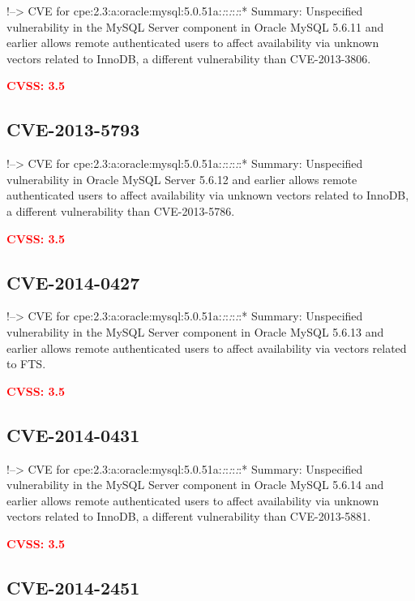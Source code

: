 \documentclass[a4paper, 12pt]{article}
\begin{document}
!--\textgreater{} CVE for
cpe:2.3:a:oracle:mysql:5.0.51a:\emph{:}:\emph{:}:\emph{:}:* Summary:
Unspecified vulnerability in the MySQL Server component in Oracle MySQL
5.6.11 and earlier allows remote authenticated users to affect
availability via unknown vectors related to InnoDB, a different
vulnerability than CVE-2013-3806.

\textbf{\textcolor{red}{CVSS: 3.5}}

\hypertarget{cve-2013-5793}{%
\subsection{CVE-2013-5793}\label{cve-2013-5793}}

!--\textgreater{} CVE for
cpe:2.3:a:oracle:mysql:5.0.51a:\emph{:}:\emph{:}:\emph{:}:* Summary:
Unspecified vulnerability in Oracle MySQL Server 5.6.12 and earlier
allows remote authenticated users to affect availability via unknown
vectors related to InnoDB, a different vulnerability than CVE-2013-5786.

\textbf{\textcolor{red}{CVSS: 3.5}}

\hypertarget{cve-2014-0427}{%
\subsection{CVE-2014-0427}\label{cve-2014-0427}}

!--\textgreater{} CVE for
cpe:2.3:a:oracle:mysql:5.0.51a:\emph{:}:\emph{:}:\emph{:}:* Summary:
Unspecified vulnerability in the MySQL Server component in Oracle MySQL
5.6.13 and earlier allows remote authenticated users to affect
availability via vectors related to FTS.

\textbf{\textcolor{red}{CVSS: 3.5}}

\hypertarget{cve-2014-0431}{%
\subsection{CVE-2014-0431}\label{cve-2014-0431}}

!--\textgreater{} CVE for
cpe:2.3:a:oracle:mysql:5.0.51a:\emph{:}:\emph{:}:\emph{:}:* Summary:
Unspecified vulnerability in the MySQL Server component in Oracle MySQL
5.6.14 and earlier allows remote authenticated users to affect
availability via unknown vectors related to InnoDB, a different
vulnerability than CVE-2013-5881.

\textbf{\textcolor{red}{CVSS: 3.5}}

\hypertarget{cve-2014-2451}{%
\subsection{CVE-2014-2451}\label{cve-2014-2451}}
\end{document}
